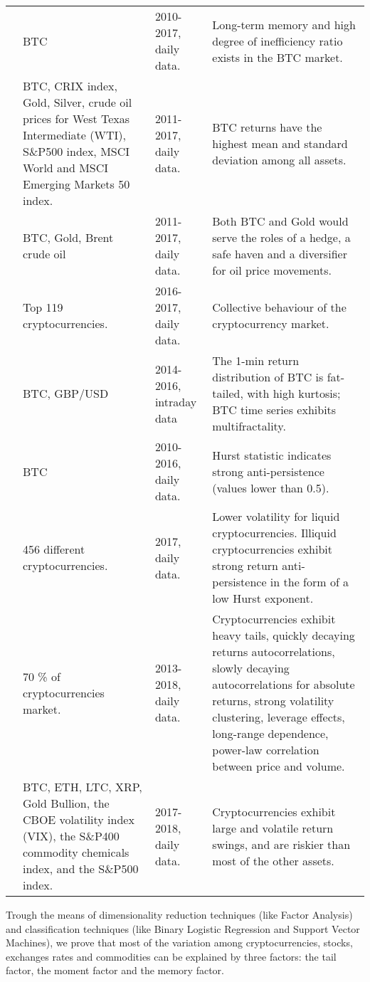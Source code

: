 \begin{table}[H]
{\begin{tabularx}{\textwidth}{p{2cm}|p{4cm}|p{1.5cm}|p{6.3cm}|}
\cite{Jiang.2018} & BTC & 2010-2017, daily data. & Long-term memory and high degree of inefficiency ratio  exists in the BTC market.\\
\cite{Klein.2018} & BTC, CRIX index, Gold, Silver, crude oil prices for West Texas Intermediate (WTI), S\&P500 index, MSCI World and MSCI Emerging Markets 50 index. & 2011-2017, daily data. & BTC returns have the highest mean and standard deviation among all assets. \\
\cite{Selmi.2018} & BTC, Gold, Brent crude oil & 2011-2017, daily data. & Both BTC and Gold would serve the roles of a hedge, a safe haven and a diversifier for oil price movements. \\
\cite{Stosic.2018} & Top 119 cryptocurrencies. & 2016-2017, daily data. & Collective behaviour of the cryptocurrency market. \\
\cite{Takaishi.2018} & BTC, GBP/USD & 2014-2016, intraday data & The 1-min return distribution of BTC is fat-tailed, with high kurtosis; BTC time series exhibits multifractality. \\
\cite{Urquhart.2016} & BTC & 2010-2016, daily data. & Hurst statistic indicates strong anti-persistence (values lower than 0.5). \\
\cite{Wei.2018} & 456 different cryptocurrencies. & 2017, daily data. & Lower volatility for liquid cryptocurrencies. Illiquid cryptocurrencies exhibit strong return anti-persistence in the form of a low Hurst exponent. \\
\cite{Zhang.2018} & 70 \% of cryptocurrencies market. & 2013-2018, daily data. & Cryptocurrencies exhibit heavy tails, quickly decaying returns autocorrelations, slowly decaying autocorrelations for absolute returns, strong volatility clustering, leverage effects, long-range dependence, power-law correlation between price and volume. \\
\cite{Borri.2019} & BTC, ETH, LTC, XRP, Gold Bullion, the CBOE volatility index (VIX), the S\&P400 commodity chemicals index, and the S\&P500 index. & 2017-2018, daily data. & Cryptocurrencies exhibit large and volatile return swings, and are riskier than most of the other assets.\\
\hline \hline
\end{tabularx}}
\end{table}

Trough the means of dimensionality reduction techniques (like Factor Analysis) and classification techniques (like Binary Logistic Regression and Support Vector Machines), we prove that most of the variation among cryptocurrencies, stocks, exchanges rates and commodities can be explained by three factors: the tail factor, the moment factor and the memory factor.

